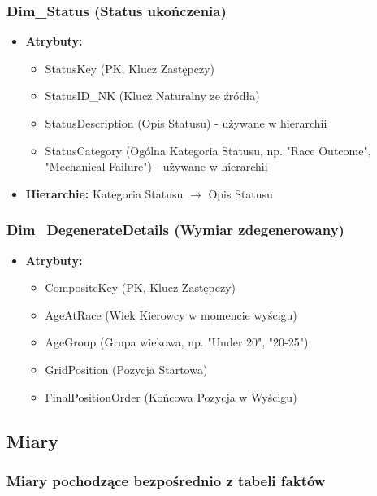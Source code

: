\documentclass[a4paper,12pt]{article}
\begin{document}
\subsubsection{Dim\_Status (Status ukończenia)}
\begin{itemize}
  \item \textbf{Atrybuty:}
        \begin{itemize}
          \item StatusKey (PK, Klucz Zastępczy)
          \item StatusID\_NK (Klucz Naturalny ze źródła)
          \item StatusDescription (Opis Statusu) - używane w hierarchii
          \item StatusCategory (Ogólna Kategoria Statusu, np. "Race Outcome", "Mechanical Failure") - używane w hierarchii
        \end{itemize}
  \item \textbf{Hierarchie:} Kategoria Statusu $\rightarrow$ Opis Statusu
\end{itemize}

\subsubsection{Dim\_DegenerateDetails (Wymiar zdegenerowany)}
\begin{itemize}
  \item \textbf{Atrybuty:}
        \begin{itemize}
          \item CompositeKey (PK, Klucz Zastępczy)
          \item AgeAtRace (Wiek Kierowcy w momencie wyścigu)
          \item AgeGroup (Grupa wiekowa, np. "Under 20", "20-25")
          \item GridPosition (Pozycja Startowa)
          \item FinalPositionOrder (Końcowa Pozycja w Wyścigu)
        \end{itemize}
\end{itemize}

\subsection{Miary}

\subsubsection*{Miary pochodzące bezpośrednio z tabeli faktów}
\end{document}
